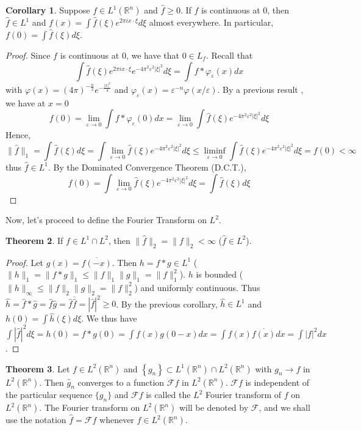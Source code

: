 \documentclass[12pt,openany]{book}
\theoremstyle{definition}
\newtheorem{theorem}{Theorem}[section]
\newtheorem{corollary}[theorem]{Corollary}
\begin{document}
\begin{corollary}
    Suppose $f \in L^1\left(\mathbb{R}^n\right)$ and $\hat{f} \geq 0$. If $f$ is continuous at 0, then $\hat{f} \in L^1$ and $f(x)=\int \hat{f}(\xi) e^{2 \pi i x \cdot \xi} d \xi$ almost everywhere. In particular, $f(0)=\int \hat{f}(\xi) d \xi$.
\end{corollary}
\begin{proof}
     Since $f$ is continuous at 0, we have that $0 \in L_f$. Recall that
$$
\int \hat{f}(\xi) e^{2 \pi i x \cdot \xi} e^{-4 \pi^2 \varepsilon^2 |\xi|^2} d \xi=\int f * \varphi_{\varepsilon}(x) dx
$$
with $\varphi(x)=(4 \pi)^{-\frac{n}{2}} e^{-\frac{|x|^2}{4}}$ and $\varphi_{\varepsilon}(x) = \varepsilon^{-n} \varphi(x/\varepsilon)$. By a previous result , we have at $x=0$
$$
f(0)=\lim _{\varepsilon \rightarrow 0} \int f * \varphi_{\varepsilon}(0) dx = \lim _{\varepsilon \rightarrow 0} \int \hat{f}(\xi) e^{-4 \pi^2 \varepsilon^2|\xi|^2} d \xi
$$
Hence,
$$
\|\hat{f}\|_1=\int \hat{f}(\xi) d\xi = \int \lim_{\varepsilon \rightarrow 0} \hat{f}(\xi) e^{-4 \pi^2 \varepsilon^2|\xi|^2} d \xi \leq \liminf _{\varepsilon \rightarrow 0} \int \hat{f}(\xi) e^{-4 \pi^2 \varepsilon^2|\xi|^2} d \xi=f(0)<\infty
$$
thus $\hat{f} \in L^1$. By the Dominated Convergence Theorem (D.C.T.), 
$$
f(0)=\int \lim _{\varepsilon \rightarrow 0} \hat{f}(\xi) e^{-4 \pi^2 \varepsilon^2|\xi|^2} d \xi=\int \hat{f}(\xi) d \xi
$$
\end{proof}
Now, let's proceed to define the Fourier Transform on $L^2$.
\begin{theorem}
    If $f \in L^1 \cap L^2$, then $\|\hat{f}\|_2=\|f\|_2<\infty$ ($\hat{f} \in L^2$).
\end{theorem}
\begin{proof}
    Let $g(x)=\overline{f(-x)}$. Then $h=f * g \in L^1$ ($\|h\|_1=\|f * g\|_1 \leq\|f\|_1\|g\|_1=\|f\|_1^2$).
$h$ is bounded ($\|h\|_{\infty} \leq\|f\|_2\|g\|_2 = \|f\|_2^2$) and uniformly continuous.
Thus $\hat{h}=\hat{f} * \hat{g}=\hat{f} \hat{g}=\hat{f} \overline{\hat{f}}=|\hat{f}|^2 \geq 0$.
By the previous corollary, $\hat{h} \in L^1$ and $h(0)=\int \hat{h}(\xi) d \xi$.
We thus have $\int|\hat{f}|^2 d\xi = h(0) = f * g(0) = \int f(x) g(0-x) dx = \int f(x) \overline{f(x)} dx = \int|f|^2 dx$.

\end{proof}
\begin{theorem}
    Let $f \in L^2(\mathbb{R}^n)$ and $\left\{g_n\right\} \subset L^1(\mathbb{R}^n) \cap L^2(\mathbb{R}^n)$ with $g_n \rightarrow f$ in $L^2(\mathbb{R}^n)$. Then $\hat{g}_n$ converges to a function $\mathcal{F}f$ in $L^2(\mathbb{R}^n)$. $\mathcal{F}f$ is independent of the particular sequence $\{g_n\}$ and $\mathcal{F}f$ is called the $L^2$ Fourier transform of $f$ on $L^2(\mathbb{R}^n)$.
The Fourier transform on $L^2(\mathbb{R}^n)$ will be denoted by $\mathcal{F}$, and we shall use the notation $\hat{f}=\mathcal{F}f$ whenever $f \in L^2(\mathbb{R}^n)$.
\end{theorem}
\end{document}

